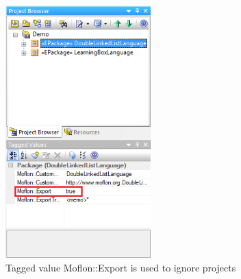 \begin{enumerate}
\begin{figure}[htbp]
\begin{center}
\includegraphics[width=0.5\textwidth]{ignoreExportingProject2}
  \caption{Tagged value Moflon::Export is used to ignore projects}  
  \label{fig_ignoreExportingProject02}
\end{center}
\end{figure}
\end{enumerate}